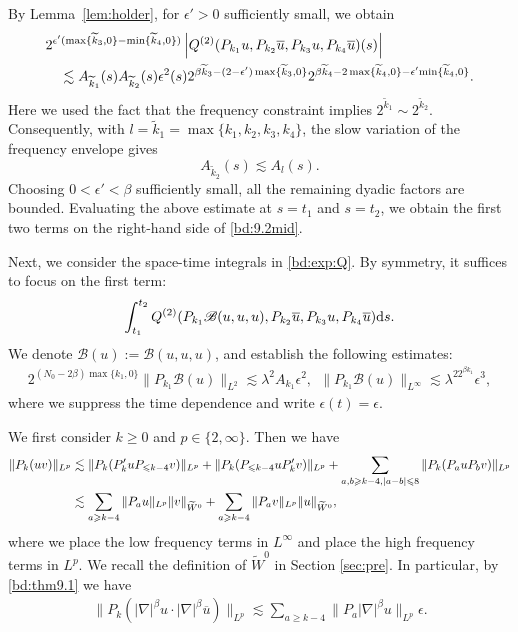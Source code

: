 \documentclass[UTF-8,reqno]{amsart}
\numberwithin{equation}{section}
\theoremstyle{definition}
\def\dif{{\mathord{{\rm d}}}}
\def\min{{\mathord{{\rm min}}}}
\def\geq{\geqslant}
\def\leq{\leqslant}
\def\dif{{\mathord{{\rm d}}}}
\def\min{{\mathord{{\rm min}}}}
\def\geq{\geqslant}
\def\leq{\leqslant}
\begin{document}
By Lemma~\ref{lem:holder}, for $\epsilon'>0$ sufficiently small,
we obtain
\begin{align*}
&2^{\epsilon'
   (\max\{\widetilde k_3,0\}
    -\min\{\widetilde k_4,0\})}
\left|
Q^{(2)}
(P_{k_1}u,P_{k_2}\overline u,
 P_{k_3}u,P_{k_4}\overline u)(s)
\right|
\\
&\quad
\lesssim
A_{\widetilde k_1}(s)
A_{\widetilde k_2}(s)
\epsilon^2(s)
2^{\beta\widetilde{k}_3
   -(2-\epsilon')\max\{\widetilde{k}_3,0\}} 
2^{\beta\widetilde{k}_4
   -2\max\{\widetilde{k}_4,0\}
   -\epsilon'\min\{\widetilde k_4,0\}}.
\end{align*}
Here we used the fact that the frequency constraint implies $ 2^{\widetilde k_1}
    \sim
    2^{\widetilde k_2}.$ 
Consequently, with
$l=\widetilde k_1=\max\{k_1,k_2,k_3,k_4\}$, the slow variation of the
frequency envelope gives
\[
    A_{\widetilde k_2}(s)\lesssim A_l(s).
\]
Choosing $0<\epsilon'<\beta$ sufficiently small, all the remaining
dyadic factors are bounded. Evaluating the above estimate at
$s=t_1$ and $s=t_2$, we obtain the first two terms on the right-hand
side of \eqref{bd:9.2mid}. 

Next, we consider the space-time integrals in \eqref{bd:exp:Q}.  
By symmetry, it suffices to focus on the first term:
 \begin{align*}
     \int_{t_1}^{t_2}Q^{(2)}  (P_{k_1}\mathscr{B}(u,u,u),P_{k_2}\overline u,P_{k_3}u,P_{k_4}\overline u)\dif s.
 \end{align*}
 We denote $\mathscr{B}(u):=\mathscr{B}(u,u,u)$, and establish the following estimates:
 \begin{align}
    2^{(N_0-2\beta)\max\{k_1,0\}} \|P_{k_1}  \mathscr{B}(u)\|_{L^2}\lesssim   \lambda^2 A_{k_1}\epsilon^2,\ \
   \|P_{k_1}  \mathscr{B}(u)\|_{L^\infty}\lesssim \lambda^22^{\beta k_1}  \epsilon^3,\label{bd:pkbu}
 \end{align}
 where we suppress the time dependence and write $\epsilon(t)=\epsilon$.
 
We first consider $k \geq 0$ and $p \in \{2, \infty\}$. Then we have
 \begin{align}
     \|P_k(uv)\|_{L^p}&\lesssim \|P_k(P'_kuP_{\leq k-4}v)\|_{L^p}+ \|P_k(P_{\leq k-4}uP'_kv)\|_{L^p}+\sum_{a,b\geq k-4,|a-b|\leq 8}\|P_k(P_auP_bv)\|_{L^p}\notag\\
     &\lesssim \sum_{a\geq k-4}\|P_au\|_{L^p}\|v\|_{\widetilde{W}^0}+\sum_{a\geq k-4}\|P_av\|_{L^p}\|u\|_{\widetilde{W}^0},\label{bd:pkuv}
 \end{align}
 where we place the low frequency terms  in $L^\infty$ and place the high frequency terms in $L^p$. We recall the definition of $\widetilde{W}^{0}$ in Section \ref{sec:pre}.
In particular, by \eqref{bd:thm9.1} we have 
 \begin{align*}
      \|P_k(|\nabla|^\beta u\cdot |\nabla|^\beta \overline u)\|_{L^p}\lesssim \sum_{a\geq k-4}\|P_a|\nabla|^\beta u\|_{L^p}\epsilon.
 \end{align*}
 
\end{document}
